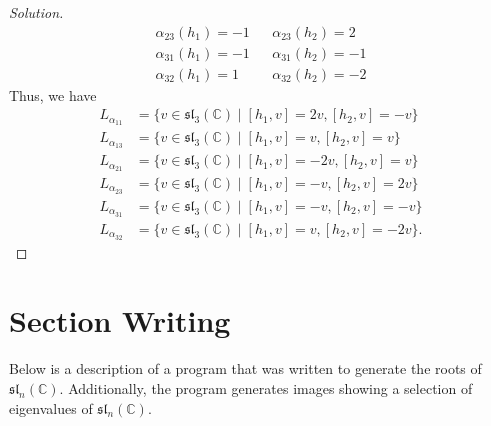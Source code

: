\documentclass[12pt]{article}
\theoremstyle{definition}
\theoremstyle{definition}
\newenvironment{solution}
  {\renewcommand\qedsymbol{$\blacksquare$}\begin{proof}[Solution]}
  {\end{proof}}
\begin{document}
\begin{enumerate}
\begin{solution}
\begin{align*}
                    &\alpha_{23}(h_1)=-1& &\alpha_{23}(h_2)=2& \\
                    &\alpha_{31}(h_1)=-1& &\alpha_{31}(h_2)=-1& \\
                    &\alpha_{32}(h_1)=1& &\alpha_{32}(h_2)=-2&
                \end{align*}
                Thus, we have 
                \begin{equation*}
                    \begin{split}
                        L_{\alpha_{11}}
                        &=\{v\in\mathfrak{sl}_3(\mathbb{C})\mid[h_1, v]=2v,
                        [h_2, v]=-v\} \\
                        L_{\alpha_{13}}
                        &=\{v\in\mathfrak{sl}_3(\mathbb{C})\mid[h_1, v]=v,
                        [h_2, v]=v\} \\
                        L_{\alpha_{21}}
                        &=\{v\in\mathfrak{sl}_3(\mathbb{C})\mid[h_1, v]=-2v,
                        [h_2, v]=v\} \\
                        L_{\alpha_{23}}
                        &=\{v\in\mathfrak{sl}_3(\mathbb{C})\mid[h_1, v]=-v,
                        [h_2, v]=2v\} \\
                        L_{\alpha_{31}}
                        &=\{v\in\mathfrak{sl}_3(\mathbb{C})\mid[h_1, v]=-v,
                        [h_2, v]=-v\} \\
                        L_{\alpha_{32}}
                        &=\{v\in\mathfrak{sl}_3(\mathbb{C})\mid[h_1, v]=v,
                        [h_2, v]=-2v\}.
                    \end{split}
                \end{equation*}
            \end{solution}
    \end{enumerate}
    \section{Section Writing}
    Below is a description of a program that was written to 
    generate the roots of $\mathfrak{sl}_n(\mathbb{C})$. Additionally, 
    the program generates images showing a selection of eigenvalues of 
    $\mathfrak{sl}_n(\mathbb{C})$.
\end{document}
